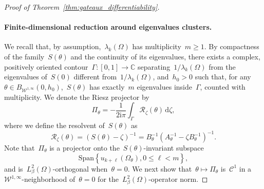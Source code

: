 \documentclass[a4]{article}
\renewcommand{\d}{\mathrm{d}}
\newcommand{\1}{\mathbbm 1}
\newcommand{\Winf}{{{\cW}^{1,\infty}}}
\newcommand{\cW}{\mathcal{W}}
\begin{document}
\begin{proof}[Proof of Theorem~\ref{thm:gateaux_differentiability}]
    \paragraph{Finite-dimensional reduction around eigenvalues clusters.}
    We recall that, by assumption,~$\lambda_k(\Omega)$ has multiplicity~$m\geq 1$.
    By compactness of the family~$S(\theta)$ and the continuity of its eigenvalues, there exists a complex, positively oriented contour~$\Gamma:[0,1]\to \mathbb C$ separating~$1/\lambda_k(\Omega)$ from the eigenvalues of~$S(0)$ different from~$1/\lambda_k(\Omega)$, and~$h_0>0$ such that, for any~$\theta\in B_{\Winf}(0,h_0)$,~$S(\theta)$ has exactly~$m$ eigenvalues inside~$\Gamma$, counted with multiplicity.
    We denote the Riesz projector by
    \begin{equation}
        \label{eq:spectral_projector}
        \Pi_\theta = -\frac1{2{\mathrm{i}}\pi}\int_{\Gamma} \mathcal R_{\zeta}(\theta)\,\d\zeta,
    \end{equation}
     where we define the resolvent of~$S(\theta)$ as
    \begin{equation}
        \label{eq:resolvent}
        \mathcal R_\zeta(\theta) = \left(S(\theta) - \zeta\right)^{-1} = B_\theta^{-1}(A_\theta^{-1}-\zeta B_\theta^{-1})^{-1}.
    \end{equation}
    Note that~$\Pi_\theta$ is a projector onto the~$S(\theta)$-invariant subspace
    $$\mathrm{Span}\left\{u_{k+\ell}(\Omega_\theta),0\leq \ell < m\right\},$$
    and is~$L^2_\beta(\Omega)$-orthogonal when~$\theta=0$.
    We next show that~$\theta\mapsto\Pi_\theta$ is~$\mathcal C^1$ in a~$\Winf$-neighborhood of~$\theta=0$ for the~$L^2_\beta(\Omega)$-operator norm.


\end{proof}
\end{document}
